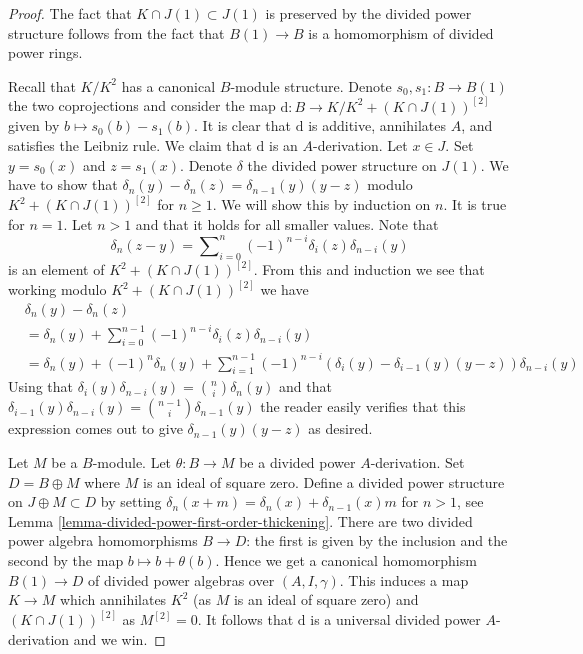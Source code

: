 \begin{proof}
The fact that $K \cap J(1) \subset J(1)$ is preserved by the divided power
structure follows from the fact that $B(1) \to B$ is a homomorphism of
divided power rings.

\medskip\noindent
Recall that $K/K^2$ has a canonical $B$-module structure.
Denote $s_0, s_1 : B \to B(1)$ the two coprojections and consider
the map $\text{d} : B \to K/K^2 +(K \cap J(1))^{[2]}$ given by
$b \mapsto s_0(b) - s_1(b)$. It is clear that $\text{d}$ is additive,
annihilates $A$, and satisfies the Leibniz rule.
We claim that $\text{d}$ is an $A$-derivation.
Let $x \in J$. Set $y = s_0(x)$ and $z = s_1(x)$.
Denote $\delta$ the divided power structure on $J(1)$.
We have to show that $\delta_n(y) - \delta_n(z) = \delta_{n - 1}(y)(y - z)$
modulo $K^2 +(K \cap J(1))^{[2]}$ for $n \geq 1$. We will show this
by induction on $n$. It is true for $n = 1$.
Let $n > 1$ and that it holds for all smaller values.
Note that
$$
\delta_n(z - y) =
\sum\nolimits_{i = 0}^n (-1)^{n - i}\delta_i(z)\delta_{n - i}(y)
$$
is an element of $K^2 +(K \cap J(1))^{[2]}$. From this and induction
we see that working modulo $K^2 +(K \cap J(1))^{[2]}$ we have
\begin{align*}
& \delta_n(y) - \delta_n(z) \\
& =
\delta_n(y) +
\sum\nolimits_{i = 0}^{n - 1} (-1)^{n - i}\delta_i(z)\delta_{n - i}(y) \\
& =
\delta_n(y) + (-1)^n\delta_n(y) +
\sum\nolimits_{i = 1}^{n - 1}
(-1)^{n - i}(\delta_i(y) - \delta_{i - 1}(y)(y - z))\delta_{n - i}(y)
\end{align*}
Using that $\delta_i(y)\delta_{n - i}(y) = \binom{n}{i} \delta_n(y)$
and that $\delta_{i - 1}(y)\delta_{n - i}(y) =
\binom{n - 1}{i} \delta_{n - 1}(y)$
the reader easily verifies that this expression comes out to give
$\delta_{n - 1}(y)(y - z)$ as desired.

\medskip\noindent
Let $M$ be a $B$-module. Let $\theta : B \to M$ be a divided power
$A$-derivation.
Set $D = B \oplus M$ where $M$ is an ideal of square zero. Define a
divided power structure on $J \oplus M \subset D$ by setting
$\delta_n(x + m) = \delta_n(x) + \delta_{n - 1}(x)m$ for $n > 1$, see
Lemma \ref{lemma-divided-power-first-order-thickening}.
There are two divided power algebra homomorphisms $B \to D$: the first
is given by the inclusion and the second by the map $b \mapsto b + \theta(b)$.
Hence we get a canonical homomorphism $B(1) \to D$ of divided power
algebras over $(A, I, \gamma)$. This induces a map $K \to M$
which annihilates $K^2$ (as $M$ is an ideal of square zero) and
$(K \cap J(1))^{[2]}$ as $M^{[2]} = 0$. It follows that $\text{d}$
is a universal divided power $A$-derivation and we win.
\end{proof}


